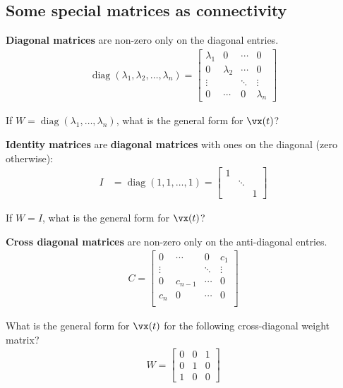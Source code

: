 \documentclass[a4paper,11pt]{exam}
\newcounter{ct}
\DeclareMathOperator*{\diag}{diag}
\begin{document}
\begin{questions}
\subsection{Some special matrices as connectivity}
\textbf{Diagonal matrices} are non-zero only on the diagonal entries.
\begin{align}\label{eq:LA:diag}
    \diag(\lambda_1, \lambda_2, \ldots, \lambda_n)
    =
    \begin{bmatrix}
	\lambda_1 & 0 & \cdots & 0 \\
	0 & \lambda_2 & \cdots & 0 \\
	\vdots & & \ddots & \vdots \\
	0 & \cdots & 0 & \lambda_n
    \end{bmatrix}
\end{align}

\question If $W = \diag(\lambda_1, \ldots, \lambda_n)$, what is the general form for $\vx(t)$?

\textbf{Identity matrices} are \textbf{diagonal matrices} with ones on the diagonal (zero otherwise):
\begin{align}\label{eq:LA:diag:eg}
    I &=
	\diag(1, 1, \ldots, 1)
    =
    \begin{bmatrix}
	1 & & \\
	& \ddots & \\
	& & 1
    \end{bmatrix}
\end{align}

\question If $W = I$, what is the general form for $\vx(t)$?

\textbf{Cross diagonal matrices} are non-zero only on the anti-diagonal entries.
\begin{align}\label{eq:LA:cdiag}
    C
    =
    \begin{bmatrix}
	0 & \cdots & 0 & c_1\\
	\vdots & & \ddots & \vdots \\
	0 & c_{n-1} & \cdots & 0 \\
	c_n & 0 & \cdots & 0 \\
    \end{bmatrix}
\end{align}

\question What is the general form for $\vx(t)$ for the following cross-diagonal weight matrix?
\begin{align}\label{eq:LA:cdiag:eg}
    W
    =
    \begin{bmatrix}
	0 & 0 & 1 \\
	0 & 1 & 0\\
	1 & 0 & 0
    \end{bmatrix}
\end{align}


\end{questions}
\end{document}
